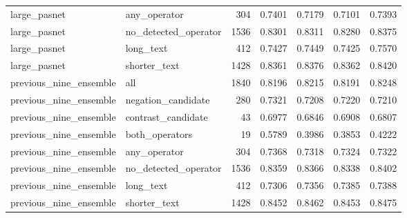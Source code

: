 \begin{tabular}{llrrrrr}
large\_pasnet & any\_operator & 304 & 0.7401 & 0.7179 & 0.7101 & 0.7393 \\
large\_pasnet & no\_detected\_operator & 1536 & 0.8301 & 0.8311 & 0.8280 & 0.8375 \\
large\_pasnet & long\_text & 412 & 0.7427 & 0.7449 & 0.7425 & 0.7570 \\
large\_pasnet & shorter\_text & 1428 & 0.8361 & 0.8376 & 0.8362 & 0.8420 \\
previous\_nine\_ensemble & all & 1840 & 0.8196 & 0.8215 & 0.8191 & 0.8248 \\
previous\_nine\_ensemble & negation\_candidate & 280 & 0.7321 & 0.7208 & 0.7220 & 0.7210 \\
previous\_nine\_ensemble & contrast\_candidate & 43 & 0.6977 & 0.6846 & 0.6908 & 0.6807 \\
previous\_nine\_ensemble & both\_operators & 19 & 0.5789 & 0.3986 & 0.3853 & 0.4222 \\
previous\_nine\_ensemble & any\_operator & 304 & 0.7368 & 0.7318 & 0.7324 & 0.7322 \\
previous\_nine\_ensemble & no\_detected\_operator & 1536 & 0.8359 & 0.8366 & 0.8338 & 0.8402 \\
previous\_nine\_ensemble & long\_text & 412 & 0.7306 & 0.7356 & 0.7385 & 0.7388 \\
previous\_nine\_ensemble & shorter\_text & 1428 & 0.8452 & 0.8462 & 0.8453 & 0.8475 \\
\bottomrule
\end{tabular}
